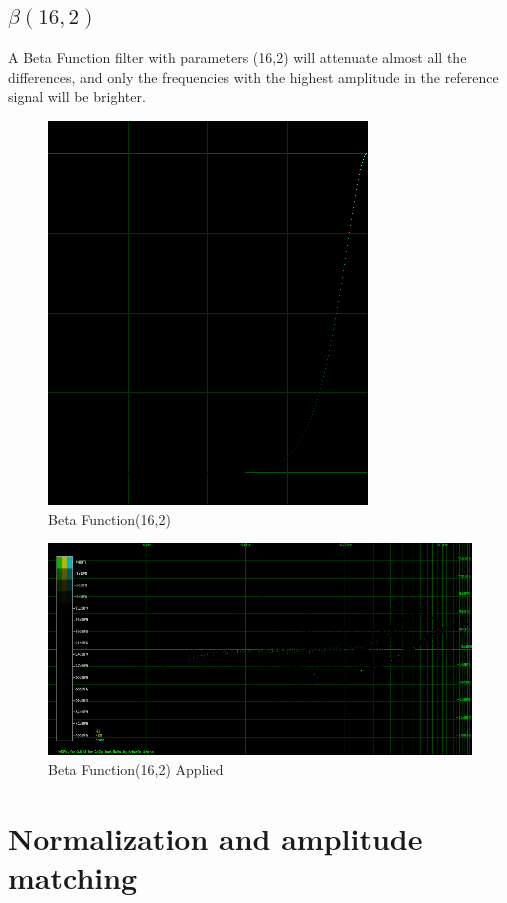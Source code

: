 \documentclass[10pt,a4paper]{report}
\begin{document}
\begin{appendices}
\newpage
\section{$\beta(16,2)$} 

A Beta Function filter with parameters (16,2) will attenuate almost all the differences, and only the frequencies with the highest amplitude in the reference signal will be brighter.

\begin{figure}[H]
	\centering
	\includegraphics[width=0.4\linewidth]{plots/BetaFunctionPlot_5.png}
	\caption[Beta Function(16,2)]{Beta Function(16,2)}
	\label{fig:betafunctionplot5}
\end{figure}

\begin{figure}[H]
	\centering
	\includegraphics[width=1\linewidth]{plots/BetaFunctionPlot_5_Data.png}
	\caption[Beta Function(16,2)]{Beta Function(16,2) Applied}
	\label{fig:betafunctionplot5data}
\end{figure}

\chapter{Normalization and amplitude matching}
\label{normalization}


\end{appendices}
\end{document}
